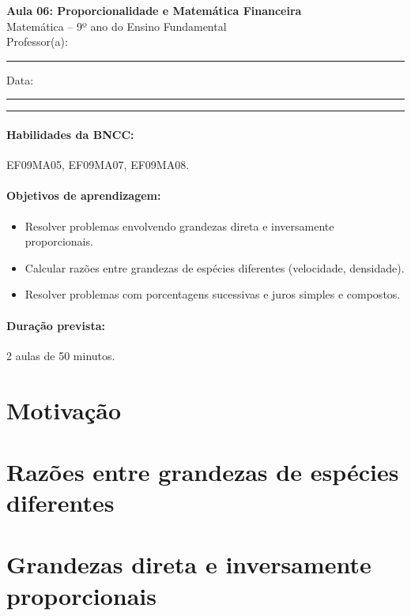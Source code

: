 \documentclass[11pt,a4paper]{article}
\newcommand{\numaula}{06}
\newcommand{\tituloaula}{Proporcionalidade e Matemática Financeira}
\begin{document}
\begin{center}
  {\Large\bfseries Aula \numaula: \tituloaula}\\[4pt]
  {\large Matemática -- 9º ano do Ensino Fundamental}\\[2pt]
  Professor(a): \rule{6cm}{0.4pt} \qquad Data: \rule{3cm}{0.4pt}
\end{center}
\noindent\rule{\linewidth}{0.8pt}

\paragraph{Habilidades da BNCC:} EF09MA05, EF09MA07, EF09MA08.

\paragraph{Objetivos de aprendizagem:}
\begin{itemize}[nosep]
  \item Resolver problemas envolvendo grandezas direta e inversamente proporcionais.
  \item Calcular razões entre grandezas de espécies diferentes (velocidade, densidade).
  \item Resolver problemas com porcentagens sucessivas e juros simples e compostos.
\end{itemize}

\paragraph{Duração prevista:} 2 aulas de 50 minutos. %

\section{Motivação}

\section{Razões entre grandezas de espécies diferentes}

\section{Grandezas direta e inversamente proporcionais}
\end{document}
